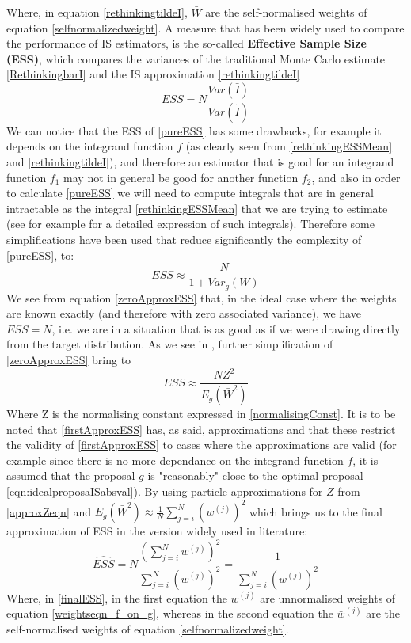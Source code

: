 \documentclass[12pt,mythesisstyle]{report}
\begin{document}
Where, in equation \eqref{rethinkingtildeI}, $\bar{W}$ are the self-normalised weights of equation \eqref{selfnormalizedweight}.
A measure that has been widely used \cite{OwenIS} \cite{RethinkingESS} to compare the performance of IS estimators, is the so-called \textbf{Effective Sample Size (ESS)}, which compares the variances of the traditional Monte Carlo estimate \eqref{RethinkingbarI} and the IS approximation \eqref{rethinkingtildeI}
\begin{equation}\label{pureESS}
ESS=N\frac{Var(\bar{I})}{Var(\tilde{I})}
\end{equation}
We can notice that the ESS of \eqref{pureESS} has some drawbacks, for example it depends on the integrand function $f$ (as clearly seen from \eqref{rethinkingESSMean} and \eqref{rethinkingtildeI}), and therefore an estimator that is good for an integrand function $f_1$ may not in general be good for another function $f_2$, and also in order to calculate \eqref{pureESS} we will need to compute integrals that are in general intractable as the integral \eqref{rethinkingESSMean} that we are trying to estimate (see for example \cite{RethinkingESS} for a detailed expression of such integrals). Therefore some simplifications have been used \cite{RethinkingESS} \cite{Kong2} that reduce significantly the complexity of \eqref{pureESS}, to:
\begin{equation}\label{zeroApproxESS}
ESS \approx \frac{N}{1+Var_g(W)}
\end{equation}
We see from equation \eqref{zeroApproxESS} that, in the ideal case where the weights are known exactly (and therefore with zero associated variance), we have $ESS=N$, i.e. we are in a situation that is as good as if we were drawing directly from the target distribution. As we see in \cite{RethinkingESS} \cite{Kong1} \cite{Kong2}, further simplification of \eqref{zeroApproxESS} bring to
\begin{equation}\label{firstApproxESS}
ESS \approx \frac{NZ^2}{E_g(\bar{W}^2)}
\end{equation}
Where Z is the normalising constant expressed in \eqref{normalisingConst}. It is to be noted that \eqref{firstApproxESS} has, as said, approximations and that these restrict the validity of \eqref{firstApproxESS} to cases where the approximations are valid \cite{Kong2} \cite{RethinkingESS} (for example since there is no more dependance on the integrand function $f$, it is assumed that the proposal $g$ is "reasonably" close to the optimal proposal \eqref{eqn:idealproposaISabsval}). By using  particle approximations for $Z$ from \eqref{approxZeqn} and $E_g(\bar{W}^2) \approx \frac{1}{N}\sum_{j=i}^{N}{(w^{(j)})^2}$ which brings us to the final approximation of ESS in the version widely used in literature:
\begin{equation}\label{finalESS}
\hat{ESS}=N\frac{(\sum_{j=i}^{N}w^{(j)})^2}{\sum_{j=i}^{N}(w^{(j)})^2}=\frac{1}{\sum_{j=i}^{N}(\bar{w}^{(j)})^2}
\end{equation}
Where, in \eqref{finalESS}, in the first equation the $w^{(j)}$ are unnormalised weights of equation \eqref{weightseqn_f_on_g}, whereas in the second equation the $\bar{w}^{(j)}$ are the self-normalised weights of equation \eqref{selfnormalizedweight}.
\end{document}

